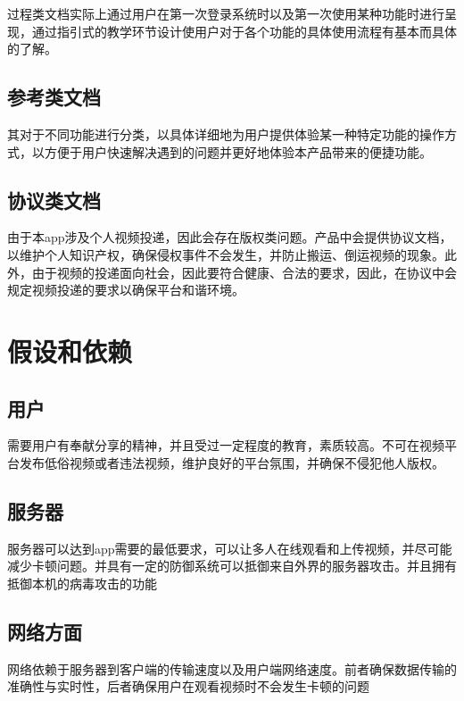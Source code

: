         过程类文档实际上通过用户在第一次登录系统时以及第一次使用某种功能时进行呈现，通过指引式的教学环节设计使用户对于各个功能的具体使用流程有基本而具体的了解。
    
    \subsection{参考类文档}
    
        其对于不同功能进行分类，以具体详细地为用户提供体验某一种特定功能的操作方式，以方便于用户快速解决遇到的问题并更好地体验本产品带来的便捷功能。
    
    \subsection{协议类文档}
    
        由于本app涉及个人视频投递，因此会存在版权类问题。产品中会提供协议文档，以维护个人知识产权，确保侵权事件不会发生，并防止搬运、倒运视频的现象。此外，由于视频的投递面向社会，因此要符合健康、合法的要求，因此，在协议中会规定视频投递的要求以确保平台和谐环境。



\section{假设和依赖}

    \subsection{用户}
    
        需要用户有奉献分享的精神，并且受过一定程度的教育，素质较高。不可在视频平台发布低俗视频或者违法视频，维护良好的平台氛围，并确保不侵犯他人版权。
    
    \subsection{服务器}
    
        服务器可以达到app需要的最低要求，可以让多人在线观看和上传视频，并尽可能减少卡顿问题。并具有一定的防御系统可以抵御来自外界的服务器攻击。并且拥有抵御本机的病毒攻击的功能
    
    \subsection{网络方面}
    
        网络依赖于服务器到客户端的传输速度以及用户端网络速度。前者确保数据传输的准确性与实时性，后者确保用户在观看视频时不会发生卡顿的问题


